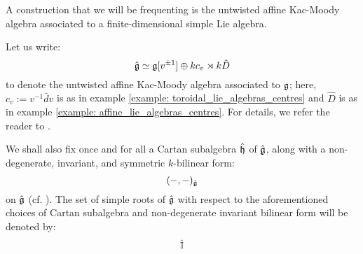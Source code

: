         A construction that we will be frequenting is the untwisted affine Kac-Moody algebra associated to a finite-dimensional simple Lie algebra.
        \begin{convention} \label{conv: a_fixed_untwisted_affine_kac_moody_algebra}
            Let us write:
                $$\hat{\mathfrak{g}} \simeq \mathfrak{g}[v^{\pm 1}] \oplus k c_v \rtimes k \hat{D}$$
            to denote the untwisted affine Kac-Moody algebra associated to $\mathfrak{g}$; here, $c_v := v^{-1} \bar{d}v$ is as in example \ref{example: toroidal_lie_algebras_centres} and $\hat{D}$ is as in example \ref{example: affine_lie_algebras_centres}. For details, we refer the reader to \cite[Chapter 7]{kac_infinite_dimensional_lie_algebras}.
            
            We shall also fix once and for all a Cartan subalgebra $\hat{\mathfrak{h}}$ of $\hat{\mathfrak{g}}$, along with a non-degenerate, invariant, and symmetric $k$-bilinear form:
                $$(-, -)_{\hat{\mathfrak{g}}}$$
            on $\hat{\mathfrak{g}}$ (cf. \cite[Chapter 2]{kac_infinite_dimensional_lie_algebras}). The set of simple roots of $\hat{\mathfrak{g}}$ with respect to the aforementioned choices of Cartan subalgebra and non-degenerate invariant bilinear form will be denoted by:
                $$\hat{\mathbb{I}}$$
        \end{convention}

